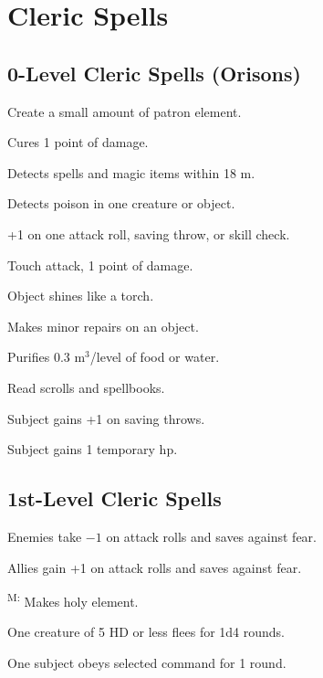 \section{Cleric Spells}



\subsection{0-Level Cleric Spells (Orisons)}

 Create a small amount of patron element.

 Cures 1 point of damage.

 Detects spells and magic items within 18 m.

 Detects poison in one creature or object.

 +1 on one attack roll, saving throw, or skill check.

 Touch attack, 1 point of damage.

 Object shines like a torch.

 Makes minor repairs on an object.

 Purifies 0.3 m$^3$/level of food or water.

 Read scrolls and spellbooks.

 Subject gains +1 on saving throws.

 Subject gains 1 temporary hp.



\subsection{1st-Level Cleric Spells}

 Enemies take $-1$ on attack rolls and saves against fear.

 Allies gain +1 on attack rolls and saves against fear.

\textsuperscript{M:} Makes holy element. %

 One creature of 5 HD or less flees for 1d4 rounds.

 One subject obeys selected command for 1 round.

